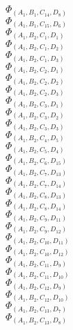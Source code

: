 \documentclass[14pt]{article}
\begin{document}
    $\Phi_{({A}_{1}, {B}_{1}, {C}_{14}, {D}_{8})}$ \\ 
    $\Phi_{({A}_{1}, {B}_{1}, {C}_{15}, {D}_{6})}$ \\ 
    $\Phi_{({A}_{1}, {B}_{2}, {C}_{1}, {D}_{1})}$ \\ 
    $\Phi_{({A}_{1}, {B}_{2}, {C}_{1}, {D}_{2})}$ \\ 
    $\Phi_{({A}_{1}, {B}_{2}, {C}_{1}, {D}_{3})}$ \\ 
    $\Phi_{({A}_{1}, {B}_{2}, {C}_{2}, {D}_{1})}$ \\ 
    $\Phi_{({A}_{1}, {B}_{2}, {C}_{2}, {D}_{2})}$ \\ 
    $\Phi_{({A}_{1}, {B}_{2}, {C}_{2}, {D}_{3})}$ \\ 
    $\Phi_{({A}_{1}, {B}_{2}, {C}_{3}, {D}_{1})}$ \\ 
    $\Phi_{({A}_{1}, {B}_{2}, {C}_{3}, {D}_{2})}$ \\ 
    $\Phi_{({A}_{1}, {B}_{2}, {C}_{3}, {D}_{3})}$ \\ 
    $\Phi_{({A}_{1}, {B}_{2}, {C}_{4}, {D}_{5})}$ \\ 
    $\Phi_{({A}_{1}, {B}_{2}, {C}_{5}, {D}_{4})}$ \\ 
    $\Phi_{({A}_{1}, {B}_{2}, {C}_{6}, {D}_{15})}$ \\ 
    $\Phi_{({A}_{1}, {B}_{2}, {C}_{7}, {D}_{13})}$ \\ 
    $\Phi_{({A}_{1}, {B}_{2}, {C}_{7}, {D}_{14})}$ \\ 
    $\Phi_{({A}_{1}, {B}_{2}, {C}_{8}, {D}_{13})}$ \\ 
    $\Phi_{({A}_{1}, {B}_{2}, {C}_{8}, {D}_{14})}$ \\ 
    $\Phi_{({A}_{1}, {B}_{2}, {C}_{9}, {D}_{11})}$ \\ 
    $\Phi_{({A}_{1}, {B}_{2}, {C}_{9}, {D}_{12})}$ \\ 
    $\Phi_{({A}_{1}, {B}_{2}, {C}_{10}, {D}_{11})}$ \\ 
    $\Phi_{({A}_{1}, {B}_{2}, {C}_{10}, {D}_{12})}$ \\ 
    $\Phi_{({A}_{1}, {B}_{2}, {C}_{11}, {D}_{9})}$ \\ 
    $\Phi_{({A}_{1}, {B}_{2}, {C}_{11}, {D}_{10})}$ \\ 
    $\Phi_{({A}_{1}, {B}_{2}, {C}_{12}, {D}_{9})}$ \\ 
    $\Phi_{({A}_{1}, {B}_{2}, {C}_{12}, {D}_{10})}$ \\ 
    $\Phi_{({A}_{1}, {B}_{2}, {C}_{13}, {D}_{7})}$ \\ 
    $\Phi_{({A}_{1}, {B}_{2}, {C}_{13}, {D}_{8})}$ \\ 
\end{document}
